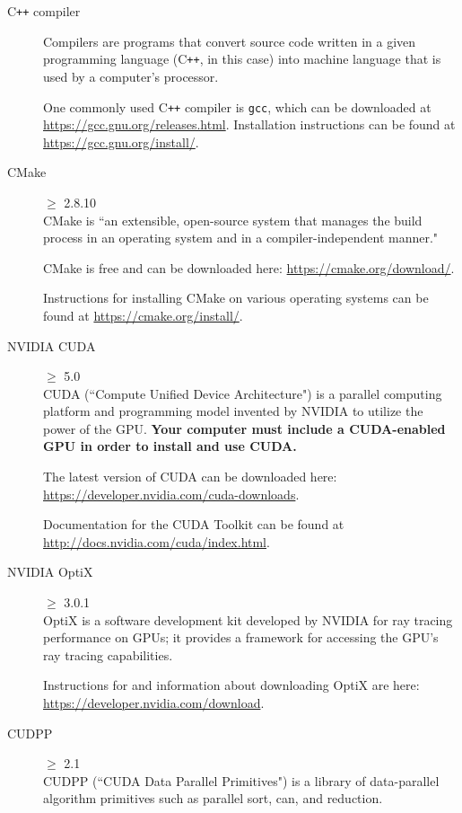 \documentclass[twoside,a4paper]{refart}
\begin{document}
\begin{description}

\item[C\texttt{++} compiler]
Compilers are programs that convert source code written in a given programming language (C\texttt{++}, in 
this case) into machine language that is used by a computer's processor.

One commonly used C\texttt{++} compiler is \texttt{gcc}, which can be downloaded at 
\url{https://gcc.gnu.org/releases.html}. Installation instructions can be found at 
\url{https://gcc.gnu.org/install/}.

\item[CMake]$\ge$ 2.8.10 \\
CMake is ``an extensible, open-source system that manages the build process in an operating system and in
a compiler-independent manner."

CMake is free and can be downloaded here: \url{https://cmake.org/download/}.

Instructions for installing CMake on various operating systems can be found at 
\url{https://cmake.org/install/}.
  
\item[NVIDIA CUDA]$\ge$ 5.0 \\
CUDA (``Compute Unified Device Architecture") is a parallel computing platform and programming model 
invented by NVIDIA to utilize the power of the GPU. \textbf{Your computer must include a CUDA-enabled 
GPU in order to install and use CUDA.}

The latest version of CUDA can be downloaded here: \url{https://developer.nvidia.com/cuda-downloads}.

Documentation for the CUDA Toolkit can be found at \url{http://docs.nvidia.com/cuda/index.html}.

\item[NVIDIA OptiX]$\ge$ 3.0.1 \\
OptiX is a software development kit developed by NVIDIA for ray tracing performance on GPUs; it provides a
framework for accessing the GPU's ray tracing capabilities.

Instructions for and information about downloading OptiX are here: \url{https://developer.nvidia.com/download}.

\item[CUDPP]$\ge$ 2.1 \\
CUDPP (``CUDA Data Parallel Primitives") is a library of data-parallel algorithm primitives such as 
parallel sort, can, and reduction.


\end{description}
\end{document}
